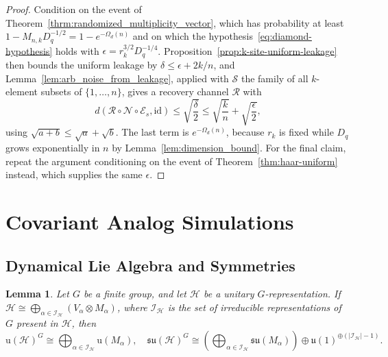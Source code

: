 \documentclass[10pt,twocolumn,superscriptaddress,aps,amsmath,amssymb,citeautoscript,floatfix,prx]{revtex4-2}
\theoremstyle{plain}
\theoremstyle{plain}
\theoremstyle{plain}
\theoremstyle{plain}
\theoremstyle{plain}
\theoremstyle{plain}
\theoremstyle{plain}
\newtheorem{smlemma}[smtheorem]{Lemma}
\theoremstyle{definition}
\theoremstyle{plain}
\begin{document}
\begin{appendix}
\begin{proof}
    Condition on the event of Theorem~\ref{thrm:randomized_multiplicity_vector}, which has probability at least $1-M_{n,k}D_q^{-1/2}=1-e^{-\Omega_d(n)}$ and on which the hypothesis~\eqref{eq:diamond-hypothesis} holds with $\epsilon=r_k^{3/2}D_q^{-1/4}$. 
    Proposition~\ref{prop:k-site-uniform-leakage} then bounds the uniform leakage by $\delta\le\epsilon+2k/n$, and Lemma~\ref{lem:arb_noise_from_leakage}, applied with $\mathcal S$ the family of all $k$-element subsets of $\{1,\ldots,n\}$, gives a recovery channel $\mathcal R$ with
    \[
        d(\mathcal R\circ\mathcal N\circ\mathcal E_s,\mathrm{id})
        \le
        \sqrt{\frac\delta2}
        \le
        \sqrt{\frac kn}
        +
        \sqrt{\frac\epsilon2},
    \]
    using $\sqrt{a+b}\le\sqrt a+\sqrt b$.  The last term is $e^{-\Omega_d(n)}$, because $r_k$ is fixed while $D_q$ grows exponentially in $n$ by Lemma~\ref{lem:dimension_bound}. 
    For the final claim, repeat the argument conditioning on the event of Theorem~\ref{thm:haar-uniform} instead, which supplies the same $\epsilon$.
\end{proof}

\section{Covariant Analog Simulations}\label{sec:supple_analog_sim}

\subsection{Dynamical Lie Algebra and Symmetries}\label{subsec:supple_finite_group_symmetry_DLA}

\begin{smlemma}\label{lem:reductive_decomposition}
    Let $G$ be a finite group, and let $\mathcal{H}$ be a unitary $G$-representation. If $\mathcal{H} \cong \bigoplus_{\alpha\in \mathcal{I}_{\mathcal{H}}}\left(V_\alpha \otimes M_{\alpha}\right)$, where $\mathcal{I}_{\mathcal{H}}$ 
    is the set of irreducible representations of $G$ present in $\mathcal{H}$, then
    $$
    \mathrm{u}(\mathcal{H})^G \cong \bigoplus_{\alpha\in \mathcal{I}_{\mathcal{H}}} \mathrm{u}\left(M_{\alpha}\right),\quad \mathfrak{s} \mathfrak{u}(\mathcal{H})^G \cong\left(\bigoplus_{\alpha\in \mathcal{I}_{\mathcal{H}}} \mathfrak{s} \mathfrak{u}\left(M_{\alpha}\right)\right) \oplus \mathfrak{u}(1)^{\oplus(|\mathcal{I}_{\mathcal{H}}|-1)} .
    $$
\end{smlemma}


\end{appendix}
\end{document}
